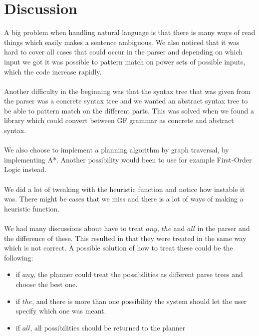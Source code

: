 \section{Discussion}
A big problem when handling natural language is that there is many ways of read
things which easily makes a sentence ambiguous. We also noticed that it was
hard to cover all cases that could occur in the parser and depending on which
input we got it was possible to pattern match on power sets of possible inputs,
which the code increase rapidly. \\\\
Another difficulty in the beginning was that the syntax tree that was given
from the parser was a concrete syntax tree and we wanted an abstract syntax
tree to be able to pattern match on the different parts. This was solved when
we found a library which could convert between GF grammar as concrete and
abstract syntax. \\\\
We also choose to implement a planning algorithm by graph traversal, by
implementing A*. Another possibility would been to use for example First-Order
Logic instead. 
\\\\
We did a lot of tweaking with the heuristic function and notice how instable it
was. There might be cases that we miss and there is a lot of ways of making a
heuristic function.
\\\\
We had many discussions about have to treat $any$, $the$ and $all$ in the
parser and the difference of these. This resulted in that they were treated in
the same way which is not correct. A possible solution of how to treat these
could be the following: 
\begin{itemize}
\item if $any$, the planner could treat the possibilities as different parse trees and choose the best one. 
\item if $the$, and there is more than one possibility the system should let the user specify which one was meant. 
\item if $all$, all possibilities should be returned to the planner
\end{itemize}
